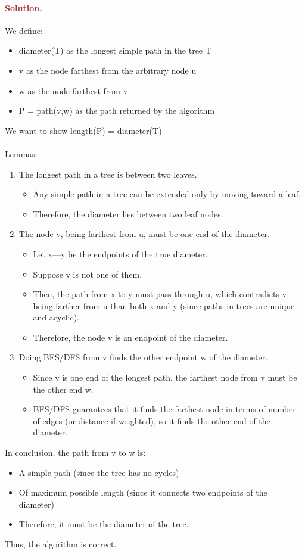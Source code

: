 \paragraph{\textcolor{brown}{Solution.}}
We define: \begin{itemize} \item diameter(T) as the longest simple path in the tree T \item v as the node farthest from the arbitrary node u \item w as the node farthest from v \item P = path(v,w) as the path returned by the algorithm \end{itemize} We want to show length(P) = diameter(T)
\\ \\ Lemmas: \begin{enumerate} \item The longest path in a tree is between two leaves. \begin{itemize} \item Any simple path in a tree can be extended only by moving toward a leaf. \item Therefore, the diameter lies between two leaf nodes. \end{itemize} \item The node v, being farthest from u, must be one end of the diameter. \begin{itemize} \item Let x—y be the endpoints of the true diameter. \item Suppose v is not one of them. \item Then, the path from x to y must pass through u, which contradicts v being farther from u than both x and y (since paths in trees are unique and acyclic). \item Therefore, the node v is an endpoint of the diameter. \end{itemize} \item Doing BFS/DFS from v finds the other endpoint w of the diameter. \begin{itemize} \item Since v is one end of the longest path, the farthest node from v must be the other end w. \item BFS/DFS guarantees that it finds the farthest node in terms of number of edges (or distance if weighted), so it finds the other end of the diameter. \end{itemize} \end{enumerate}
In conclusion, the path from v to w is: \begin{itemize} \item A simple path (since the tree has no cycles) \item Of maximum possible length (since it connects two endpoints of the diameter) \item Therefore, it must be the diameter of the tree. \end{itemize}
Thus, the algorithm is correct.


